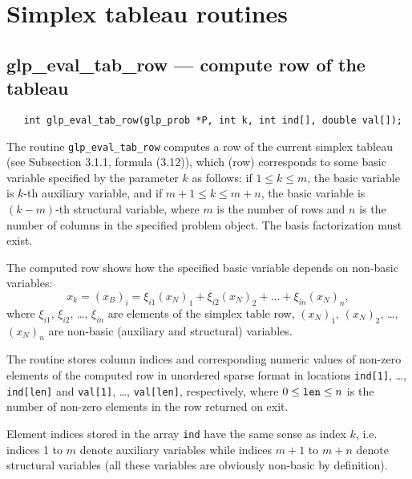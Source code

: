 
\newpage

\section{Simplex tableau routines}

\subsection{glp\_eval\_tab\_row --- compute row of the tableau}

\synopsis

\begin{verbatim}
   int glp_eval_tab_row(glp_prob *P, int k, int ind[], double val[]);
\end{verbatim}

\description

The routine \verb|glp_eval_tab_row| computes a row of the current
simplex tableau (see Subsection 3.1.1, formula (3.12)), which (row)
corresponds to some basic variable specified by the parameter $k$ as
follows: if $1\leq k\leq m$, the basic variable is $k$-th auxiliary
variable, and if $m+1\leq k\leq m+n$, the basic variable is $(k-m)$-th
structural variable, where $m$ is the number of rows and $n$ is the
number of columns in the specified problem object. The basis
factorization must exist.

The computed row shows how the specified basic variable depends on
non-basic variables:
$$x_k=(x_B)_i=\xi_{i1}(x_N)_1+\xi_{i2}(x_N)_2+\dots+\xi_{in}(x_N)_n,$$
where $\xi_{i1}$, $\xi_{i2}$, \dots, $\xi_{in}$ are elements of the
simplex table row, $(x_N)_1$, $(x_N)_2$, \dots, $(x_N)_n$ are non-basic
(auxiliary and structural) variables.

The routine stores column indices and corresponding numeric values of
non-zero elements of the computed row in unordered sparse format in
locations \verb|ind[1]|, \dots, \verb|ind[len]| and \verb|val[1]|,
\dots, \verb|val[len]|, respectively, where $0\leq{\tt len}\leq n$ is
the number of non-zero elements in the row returned on exit.

Element indices stored in the array \verb|ind| have the same sense as
index $k$, i.e. indices 1 to $m$ denote auxiliary variables while
indices $m+1$ to $m+n$ denote structural variables (all these variables
are obviously non-basic by definition).

\returns

